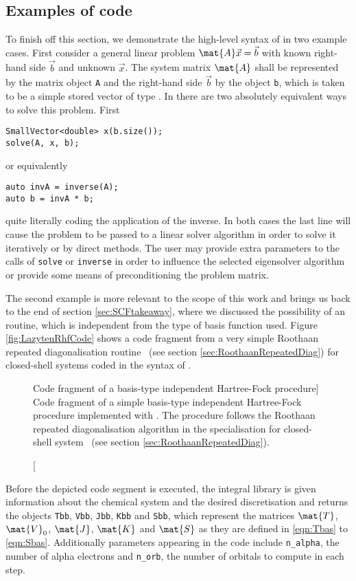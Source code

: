 \subsection{Examples of \lazyten code}
\label{sec:LazytenExamples}
To finish off this section,
we demonstrate the high-level syntax of \lazyten
in two example cases.
First consider a general linear problem $\mat{A} \vec{x} = \vec{b}$
with known right-hand side $\vec{b}$ and unknown $\vec{x}$.
The system matrix $\mat{A}$ shall
be represented by the \lazyten matrix object \texttt{A}
and the right-hand side $\vec{b}$ by the object \texttt{b},
which is taken to be a simple stored vector of type .
In \lazyten there are two absolutely equivalent ways to solve this problem.
First
\begin{lstlisting}[style=c++]
SmallVector<double> x(b.size());
solve(A, x, b);
\end{lstlisting}
or equivalently
\begin{lstlisting}[style=c++]
auto invA = inverse(A);
auto b = invA * b;
\end{lstlisting}
\ie quite literally coding the application of the inverse.
In both cases the last line will cause the problem to be passed
to a linear solver algorithm in order to solve it iteratively
or by direct methods.
The user may provide extra parameters to the calls of \texttt{solve}
or \texttt{inverse} in order to influence
the selected eigensolver algorithm
or provide some means of preconditioning the problem matrix.

The second example is more relevant to the scope of this
work and brings us back to the end of section \vref{sec:SCFtakeaway},
where we discussed the possibility of
an \SCF routine,
which is independent from the type of basis function used.
Figure \vref{fig:LazytenRhfCode} shows a code fragment
from a very simple Roothaan repeated diagonalisation \SCF routine%
~(see section \vref{sec:RoothaanRepeatedDiag})
for closed-shell systems coded in the syntax of \lazyten.

\begin{figure}
	\centering
	\caption
	[Code fragment of a basis-type independent
		Hartree-Fock procedure]
	{Code fragment of a simple basis-type independent
		Hartree-Fock procedure implemented with \lazyten.
		The procedure follows the Roothaan repeated diagonalisation
		algorithm in the specialisation for closed-shell system%
		~(see section \ref{sec:RoothaanRepeatedDiag}).
	}
	\label{fig:LazytenRhfCode}
\end{figure}
Before the depicted code segment is executed,
the integral library is given information about the chemical system
and the desired discretisation and returns
the objects \texttt{Tbb}, \texttt{Vbb}, \texttt{Jbb}, \texttt{Kbb}
and \texttt{Sbb},
which represent the matrices
$\mat{T}$, $\mat{V}_0$, $\mat{J}$, $\mat{K}$ and $\mat{S}$
as they are defined in \eqref{eqn:Tbas} to \eqref{eqn:Sbas}.
Additionally parameters appearing in the code
include \texttt{n\_alpha}, the number of alpha electrons
and \texttt{n\_orb}, the number of \SCF orbitals to compute in each step.

